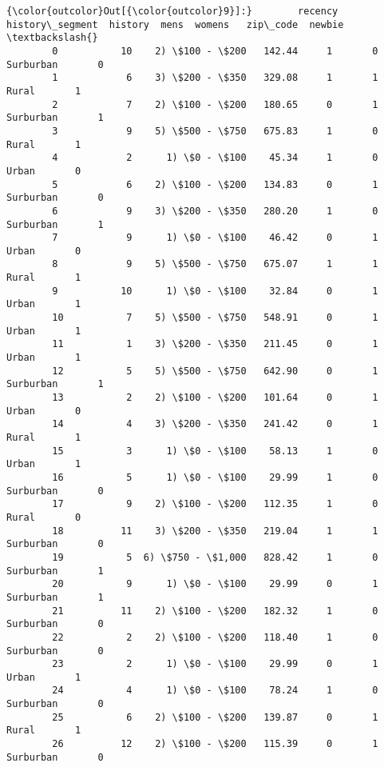 \documentclass[11pt]{article}
\begin{document}
\begin{Verbatim}[commandchars=\\\{\}]
{\color{outcolor}Out[{\color{outcolor}9}]:}        recency   history\_segment  history  mens  womens   zip\_code  newbie  \textbackslash{}
        0           10    2) \$100 - \$200   142.44     1       0  Surburban       0   
        1            6    3) \$200 - \$350   329.08     1       1      Rural       1   
        2            7    2) \$100 - \$200   180.65     0       1  Surburban       1   
        3            9    5) \$500 - \$750   675.83     1       0      Rural       1   
        4            2      1) \$0 - \$100    45.34     1       0      Urban       0   
        5            6    2) \$100 - \$200   134.83     0       1  Surburban       0   
        6            9    3) \$200 - \$350   280.20     1       0  Surburban       1   
        7            9      1) \$0 - \$100    46.42     0       1      Urban       0   
        8            9    5) \$500 - \$750   675.07     1       1      Rural       1   
        9           10      1) \$0 - \$100    32.84     0       1      Urban       1   
        10           7    5) \$500 - \$750   548.91     0       1      Urban       1   
        11           1    3) \$200 - \$350   211.45     0       1      Urban       1   
        12           5    5) \$500 - \$750   642.90     0       1  Surburban       1   
        13           2    2) \$100 - \$200   101.64     0       1      Urban       0   
        14           4    3) \$200 - \$350   241.42     0       1      Rural       1   
        15           3      1) \$0 - \$100    58.13     1       0      Urban       1   
        16           5      1) \$0 - \$100    29.99     1       0  Surburban       0   
        17           9    2) \$100 - \$200   112.35     1       0      Rural       0   
        18          11    3) \$200 - \$350   219.04     1       1  Surburban       0   
        19           5  6) \$750 - \$1,000   828.42     1       0  Surburban       1   
        20           9      1) \$0 - \$100    29.99     0       1  Surburban       1   
        21          11    2) \$100 - \$200   182.32     1       0  Surburban       0   
        22           2    2) \$100 - \$200   118.40     1       0  Surburban       0   
        23           2      1) \$0 - \$100    29.99     0       1      Urban       1   
        24           4      1) \$0 - \$100    78.24     1       0  Surburban       0   
        25           6    2) \$100 - \$200   139.87     0       1      Rural       1   
        26          12    2) \$100 - \$200   115.39     0       1  Surburban       0   

\end{Verbatim}
\end{document}
